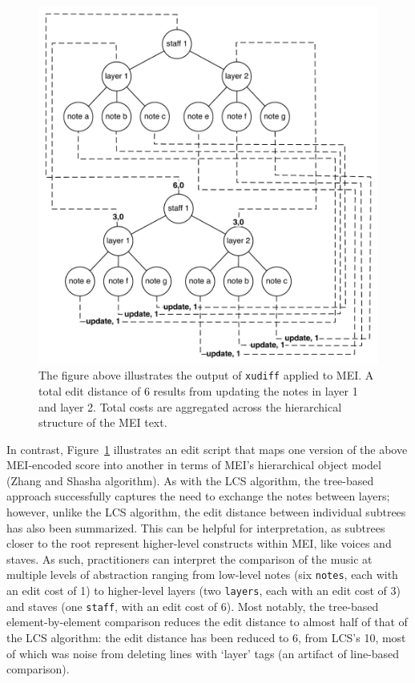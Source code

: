 \documentclass{article}
\newcommand{\code}[1]{\texttt{#1}}
\begin{document}
\begin{figure}[h]
\centering
\includegraphics[width=\columnwidth]{figures/hierarchical-diff.pdf}
\caption{The figure above illustrates the output of \code{xudiff}
  applied to MEI.  A total edit distance of 6 results from updating
  the notes in layer 1 and layer 2.  Total costs are aggregated across
the hierarchical structure of the MEI text.}
\label{fig:hierarchical-diff}
\end{figure}

In contrast, Figure~\ref{fig:hierarchical-diff} illustrates an edit
script that maps one version of the above MEI-encoded score into another
in terms of MEI's hierarchical object model (Zhang and Shasha algorithm).  As with the LCS
algorithm, the tree-based approach successfully captures the need to
exchange the notes between layers; however, unlike the LCS algorithm, the edit distance between individual subtrees has also been
summarized.  This can be helpful for interpretation, as subtrees closer
to the root represent higher-level constructs within MEI, like voices and staves.  
As such, practitioners can interpret the comparison of the music at multiple levels 
of abstraction ranging from low-level notes (six \code{notes}, each with an edit cost of 1) 
to higher-level layers (two \code{layers}, each with an edit cost of 3) and staves (one \code{staff}, 
with an edit cost of 6). Most notably, the tree-based element-by-element comparison reduces the edit distance to almost half of that of the LCS algorithm: the edit distance has been reduced to 6, from LCS's 10, most of which was noise from deleting lines with `layer' tags (an artifact of line-based comparison).
\end{document}
